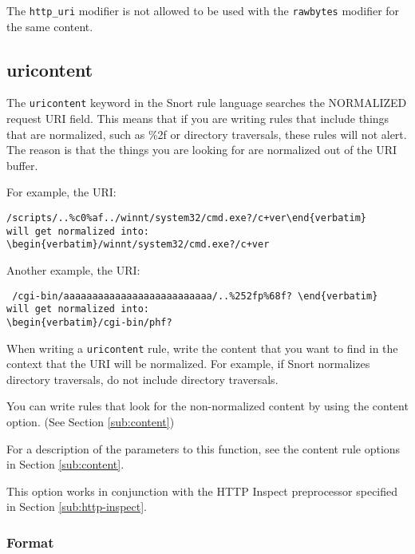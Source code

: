 \documentclass[english]{report}
\newenvironment{note}{
\samepage
    \vspace{10pt}{\textsf{
        {\hspace{7pt}\Huge{$\triangle$\hspace{-12.5pt}{\Large{$^!$}}}}\hspace{5pt}
        {\Large{NOTE}}
    }
    }
   \begin{center}
    \par\vspace{-17pt}

    \begin{lrbox}{\savepar}
    \begin{minipage}[r]{6in}
}
{
    \end{minipage}
    \end{lrbox}
    \fbox{
        \usebox{
            \savepar
	}
    }
    \par\vskip10pt
    \end{center}
}
\begin{document}
\begin{note}
The \texttt{http\_uri} modifier is not allowed to be used with
the \texttt{rawbytes} modifier for the same content.
\end{note}

\subsection{uricontent\label{sub:UriContent}}

The \texttt{uricontent} keyword in the Snort rule language searches the
NORMALIZED request \textsc{URI} field.  This means that if you are writing
rules that include things that are normalized, such as \%2f or directory
traversals, these rules will not alert.  The reason is that the things you
are looking for are normalized out of the URI buffer.  

For example, the URI: 
\begin{verbatim}/scripts/..%c0%af../winnt/system32/cmd.exe?/c+ver\end{verbatim}
will get normalized into:
\begin{verbatim}/winnt/system32/cmd.exe?/c+ver\end{verbatim}

Another example, the URI:
\begin{verbatim} /cgi-bin/aaaaaaaaaaaaaaaaaaaaaaaaaa/..%252fp%68f? \end{verbatim}
will get normalized into:
\begin{verbatim}/cgi-bin/phf?\end{verbatim}

When writing a \texttt{uricontent} rule, write the content that you want to
find in the context that the URI will be normalized.  For example, if Snort
normalizes directory traversals, do not include directory traversals.  

You can write rules that look for the non-normalized content by using the
content option.  (See Section \ref{sub:content})

For a description of the parameters to this function, see the content rule
options in Section \ref{sub:content}. 

This option works in conjunction with the HTTP Inspect preprocessor specified
in Section \ref{sub:http-inspect}.

\subsubsection{Format}
\end{document}
